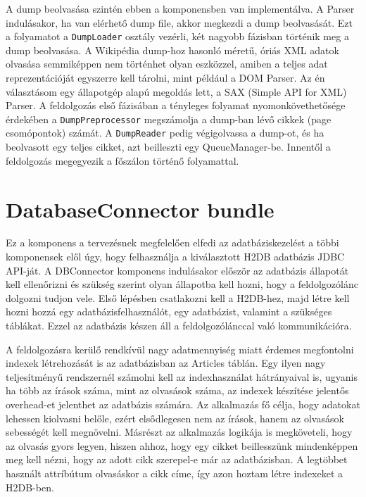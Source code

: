 A dump beolvasása szintén ebben a komponensben van implementálva. A Parser indulásakor, ha van elérhető dump file, akkor megkezdi a dump beolvasását. Ezt a folyamatot a \texttt{DumpLoader} osztály vezérli, két nagyobb fázisban történik meg a dump beolvasása. A Wikipédia dump-hoz hasonló méretű, óriás XML adatok olvasása semmiképpen nem történhet olyan eszközzel, amiben a teljes adat reprezentációját egyszerre kell tárolni, mint például a DOM Parser. Az én választásom egy állapotgép alapú megoldás lett, a SAX (Simple API for XML) Parser. A feldolgozás első fázisában a tényleges folyamat nyomonkövethetősége érdekében a \texttt{DumpPreprocessor} megszámolja a dump-ban lévő cikkek (page csomópontok) számát. A \texttt{DumpReader} pedig végigolvassa a dump-ot, és ha beolvasott egy teljes cikket, azt beilleszti egy QueueManager-be. Innentől a feldolgozás megegyezik a főszálon történő folyamattal.


\section{DatabaseConnector bundle}
\label{sec:dbconnectorbundle}

Ez a komponens a tervezésnek megfelelően elfedi az adatbáziskezelést a többi komponensek elől úgy, hogy felhasználja a kiválasztott H2DB adatbázis JDBC API-ját. A DBConnector komponens indulásakor először az adatbázis állapotát kell ellenőrizni és szükség szerint olyan állapotba kell hozni, hogy a feldolgozólánc dolgozni tudjon vele. Első lépésben csatlakozni kell a H2DB-hez, majd létre kell hozni hozzá egy adatbázisfelhasználót, egy adatbázist, valamint a szükséges táblákat. Ezzel az adatbázis készen áll a feldolgozólánccal való kommunikációra.

A feldolgozásra kerülő rendkívül nagy adatmennyiség miatt érdemes megfontolni indexek létrehozását is az adatbázisban az Articles táblán. Egy ilyen nagy teljesítményű rendszernél számolni kell az indexhasználat hátrányaival is, ugyanis ha több az írások száma, mint az olvasások száma, az indexek készítése jelentős overhead-et jelenthet az adatbázis számára. Az alkalmazás fő célja, hogy adatokat lehessen kiolvasni belőle, ezért elsődlegesen nem az írások, hanem az olvasások sebességét kell megnövelni. Másrészt az alkalmazás logikája is megköveteli, hogy az olvasás gyors legyen, hiszen ahhoz, hogy egy cikket beillesszünk mindenképpen meg kell nézni, hogy az adott cikk szerepel-e már az adatbázisban. A legtöbbet használt attríbútum olvasáskor a cikk címe, így azon hoztam létre indexeket a H2DB-ben.

